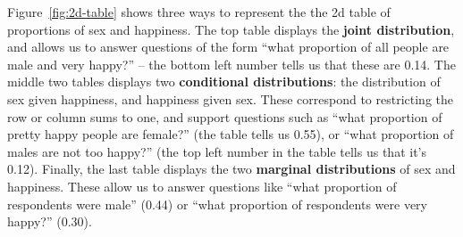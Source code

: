 \documentclass[journal]{vgtc}
\begin{document}
Figure~\ref{fig:2d-table} shows three ways to represent the the 2d table of proportions of sex and happiness. The top table displays the {\bf joint distribution}, and allows us to answer questions of the form ``what proportion of all people are male and very happy?'' -- the bottom left number tells us that these are 0.14. The middle two tables displays two {\bf conditional distributions}: the distribution of sex given happiness, and happiness given sex. These correspond to restricting the row or column sums to one, and support questions such as ``what proportion of pretty happy people are female?'' (the table tells us 0.55), or ``what proportion of males are not too happy?'' (the top left number in the table tells us that it's 0.12). Finally, the last table displays the two {\bf marginal distributions} of sex and happiness. These allow us to answer questions like ``what proportion of respondents were male'' (0.44) or ``what proportion of respondents were very happy?'' (0.30).
\end{document}
